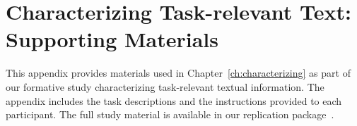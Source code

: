\chapter{Characterizing Task-relevant Text: Supporting Materials}

This appendix provides materials used in
Chapter~\ref{ch:characterizing}
as part of our formative study characterizing task-relevant textual information.
The appendix includes the task descriptions and the instructions  provided 
to each participant. The full study material is available in our replication package~\cite{dssynthetic}.








